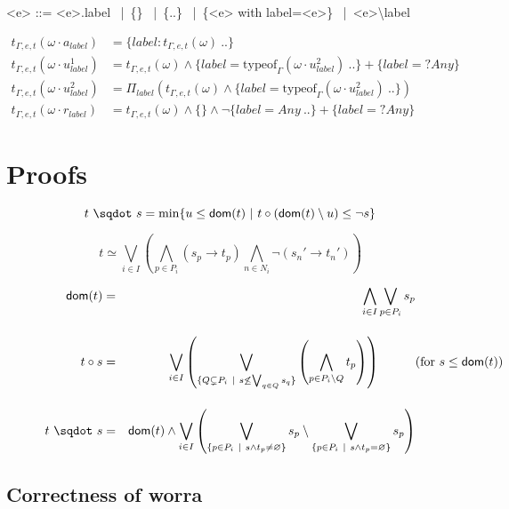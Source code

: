\documentclass[a4paper]{article}%
\newcommand{\worra}[2]{#1\mathop{\,\sqdot\,} #2}
\newcommand{\apply}[2]{#1\circ#2}
\newcommand{\dom}[1]{\textsf{dom}(#1)}
\newcommand{\alt}{~|~}
\begin{document}
    \begin{grammar}
        \let\syntleft\relax
        \let\syntright\relax
        <e> ::= <e>.label \alt \{\} \alt \{..\} \alt \{<e> with label=<e>\} \alt <e>\textbackslash label
    \end{grammar}

    \begin{align*}
        t_{\Gamma,e,t}(\omega\cdot a_{label}) &= \{ label: t_{\Gamma,e,t}(\omega) \ .. \}\\
        t_{\Gamma,e,t}(\omega\cdot u_{label}^1) &= t_{\Gamma,e,t}(\omega) \land \{label=\text{typeof}_{\Gamma}(\omega \cdot u_{label}^2) \ .. \} + \{ label =? Any \}\\
        t_{\Gamma,e,t}(\omega\cdot u_{label}^2) &= \Pi_{label}(t_{\Gamma,e,t}(\omega) \land \{label=\text{typeof}_{\Gamma}(\omega \cdot u_{label}^2) \ .. \})\\
        t_{\Gamma,e,t}(\omega\cdot r_{label}) &= t_{\Gamma,e,t}(\omega) \land \{\} \land \neg \{label=Any \ .. \} + \{ label =? Any \}
    \end{align*}

    \section{Proofs}

    \[ \worra t s = \min \{ u \leq \dom t \alt \apply t {(\dom t \setminus u)} \leq \neg s \} \]

    \[ t \simeq \bigvee_{i\in I}\left(\bigwedge_{p\in P_i}(s_p\to t_p)\bigwedge_{n\in N_i}\neg(s_n'\to t_n')\right) \]

    \begin{eqnarray*}
        \dom{t}    & = & \bigwedge_{i\in I}\bigvee_{p\in P_i}s_p\\[4mm]
        \apply t s & = & \bigvee_{i\in I}\left(\bigvee_{\{Q\subsetneq P_i\alt s\not\leq\bigvee_{q\in Q}s_q\}}\left(\bigwedge_{p\in P_i\setminus Q}t_p\right)\right)\hspace*{1cm}\makebox[0cm][l]{(for $s\leq\dom{t}$)}\\[4mm]
        \worra t s & = & \dom t \wedge\bigvee_{i\in I}\left(\bigvee_{\{p\in P_i\alt s\wedge t_p\not=\varnothing\}}s_p \setminus \bigvee_{\{p\in P_i\alt s\wedge t_p=\varnothing\}}s_p \right)
    \end{eqnarray*}

    \subsection{Correctness of worra}
    
\end{document}
